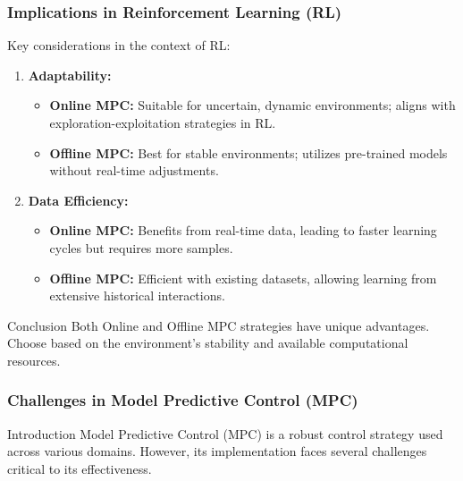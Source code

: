 \documentclass[aspectratio=169]{beamer}
\begin{document}
\begin{frame}[fragile]
    \frametitle{Implications in Reinforcement Learning (RL)}
    Key considerations in the context of RL:

    \begin{enumerate}
        \item \textbf{Adaptability:}
            \begin{itemize}
                \item \textbf{Online MPC:} Suitable for uncertain, dynamic environments; aligns with exploration-exploitation strategies in RL.
                \item \textbf{Offline MPC:} Best for stable environments; utilizes pre-trained models without real-time adjustments.
            \end{itemize}

        \item \textbf{Data Efficiency:}
            \begin{itemize}
                \item \textbf{Online MPC:} Benefits from real-time data, leading to faster learning cycles but requires more samples.
                \item \textbf{Offline MPC:} Efficient with existing datasets, allowing learning from extensive historical interactions.
            \end{itemize}
    \end{enumerate}
    
    \begin{block}{Conclusion}
        Both Online and Offline MPC strategies have unique advantages. Choose based on the environment's stability and available computational resources.
    \end{block}
\end{frame}

\begin{frame}[fragile]
    \frametitle{Challenges in Model Predictive Control (MPC)}
    \begin{block}{Introduction}
        Model Predictive Control (MPC) is a robust control strategy used across various domains. However, its implementation faces several challenges critical to its effectiveness.
    \end{block}
\end{frame}
\end{document}
